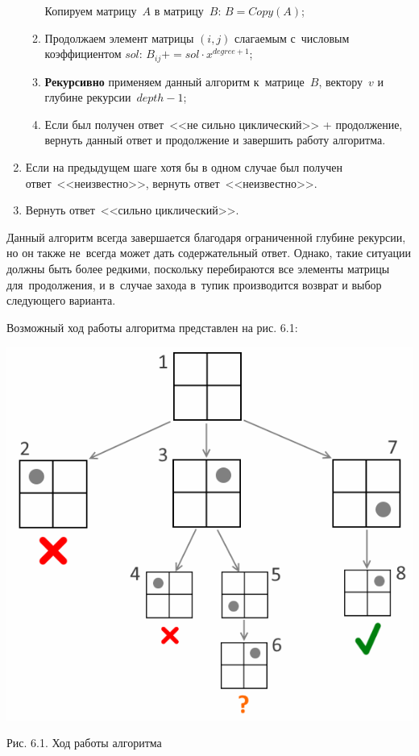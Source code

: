 \begin{enumerate}
\begin{enumerate}
                Копируем матрицу~$A$ в матрицу~$B$: $B = Copy(A)$;
            \item
                Продолжаем элемент матрицы $(i, j)$ слагаемым с~числовым коэффициентом $sol$:
                $B_{ij} \mathrel{{+}{=}} sol \cdot x^{degree + 1}$;
            \item
                \textbf{Рекурсивно} применяем данный алгоритм
                к~матрице~$B$, вектору~$v$ и глубине рекурсии~$depth - 1$;
            \item
                Если был получен ответ~<<не сильно циклический>> + продолжение, вернуть данный ответ и продолжение
                и завершить работу алгоритма.
        \end{enumerate}
    \item
        Если на предыдущем шаге хотя бы в одном случае был получен ответ~<<неизвестно>>, вернуть ответ~<<неизвестно>>.
    \item
        Вернуть ответ~<<сильно циклический>>.
\end{enumerate}

Данный алгоритм всегда завершается благодаря ограниченной глубине рекурсии,
но он также не~всегда может дать содержательный ответ.
Однако, такие ситуации должны быть более редкими, поскольку перебираются все элементы матрицы для~продолжения,
и в~случае захода в~тупик производится возврат и выбор следующего варианта.
\medskip

Возможный ход работы алгоритма представлен на рис. 6.1:

\begin{center}
    \includegraphics[scale=0.6]{pictures/recursion.png}

    \small
    Рис. 6.1. Ход работы алгоритма
\end{center}

